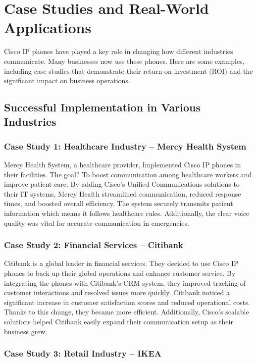 \documentclass[11pt,a4paper]{article}
\begin{document}
\section*{Case Studies and Real-World Applications}

Cisco IP phones have played a key role in changing how different industries communicate. Many businesses now use these phones. Here are some examples, including case studies that demonstrate their return on investment (ROI) and the significant impact on business operations.


\subsection*{Successful Implementation in Various Industries}

\subsubsection*{Case Study 1: Healthcare Industry – Mercy Health System}

Mercy Health System, a healthcare provider, Implemented Cisco IP phones in their facilities. The goal? To boost communication among healthcare workers and improve patient care. By adding Cisco’s Unified Communications solutions to their IT systems, Mercy Health streamlined communication, reduced response times, and boosted overall efficiency. The system securely transmits patient information which means it follows healthcare rules. Additionally, the clear voice quality was vital for accurate communication in emergencies.


\subsubsection*{Case Study 2: Financial Services – Citibank}

Citibank is a global leader in financial services. They decided to use Cisco IP phones to back up their global operations and enhance customer service. By integrating the phones with Citibank’s CRM system, they improved tracking of customer interactions and resolved issues more quickly. Citibank noticed a significant increase in customer satisfaction scores and reduced operational costs. Thanks to this change, they became more efficient. Additionally, Cisco’s scalable solutions helped Citibank easily expand their communication setup as their business grew.

\subsubsection*{Case Study 3: Retail Industry – IKEA}
\end{document}
